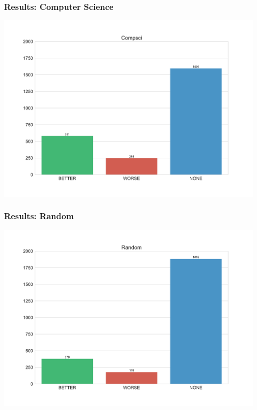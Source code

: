 \documentclass[11pt,aspectratio=169]{beamer}
\begin{document}
    \begin{frame}
        \frametitle{Results: Computer Science}
        \begin{center}
            \includegraphics[scale=0.3]{images/Compsci-dist.pdf}
        \end{center}
    \end{frame}

    \begin{frame}
        \frametitle{Results: Random}
        \begin{center}
            \includegraphics[scale=0.3]{images/Random-dist.pdf}
        \end{center}
    \end{frame}
\end{document}
